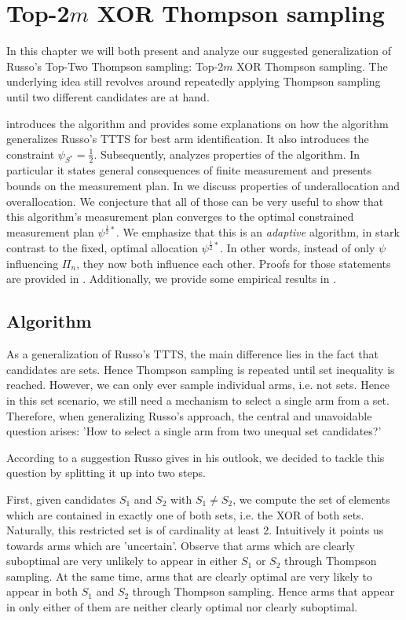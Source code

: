 \chapter{Top-2$m$ XOR Thompson sampling}\label{chapter:algorithm}

In this chapter we will both present and analyze our suggested generalization of
Russo's Top-Two Thompson sampling: Top-2$m$ XOR Thompson sampling. The
underlying idea still revolves around repeatedly applying Thompson sampling
until two different candidates are at hand.

 introduces the algorithm and provides some explanations
on how the algorithm generalizes Russo's TTTS for best arm identification. It
also introduces the constraint $\psi_{S^*} = \frac{1}{2}$. Subsequently,
 analyzes properties of the algorithm. In particular it
states general consequences of finite measurement and presents bounds on the
measurement plan. In  we discuss properties of
underallocation and overallocation. We conjecture that all of those can be very
useful to show that this algorithm's measurement plan converges to the optimal
constrained measurement plan $\psi^{\frac{1}{2}*}$. We emphasize that this is an
\emph{adaptive} algorithm, in stark contrast to the fixed, optimal allocation
$\psi^{\frac{1}{2}*}$. In other words, instead of only $\psi$ influencing
$\Pi_n$, they now both influence each other. Proofs for those statements are
provided in . Additionally, we provide some empirical
results in .

\section{Algorithm}\label{section:algorithm}
As a generalization of Russo's TTTS, the main difference lies in the fact that
candidates are sets. Hence Thompson sampling is repeated until set inequality is
reached. However, we can only ever sample individual arms, i.e. not sets. Hence
in this set scenario, we still need a mechanism to select a single arm from a
set. Therefore, when generalizing Russo's approach, the central and unavoidable
question arises: 'How to select a single arm from two unequal set candidates?'

According to a suggestion Russo gives in his outlook, we decided to tackle this
question by splitting it up into two steps.

First, given candidates $S_1$ and $S_2$ with $S_1 \neq S_2$, we compute the set
of elements which are contained in exactly one of both sets, i.e. the XOR of
both sets. Naturally, this restricted set is of cardinality at least 2.
Intuitively it points us towards arms which are 'uncertain'. Observe that arms
which are clearly suboptimal are very unlikely to appear in either $S_1$ or
$S_2$ through Thompson sampling. At the same time, arms that are clearly optimal
are very likely to appear in both $S_1$ and $S_2$ through Thompson sampling.
Hence arms that appear in only either of them are neither clearly optimal nor
clearly suboptimal.

